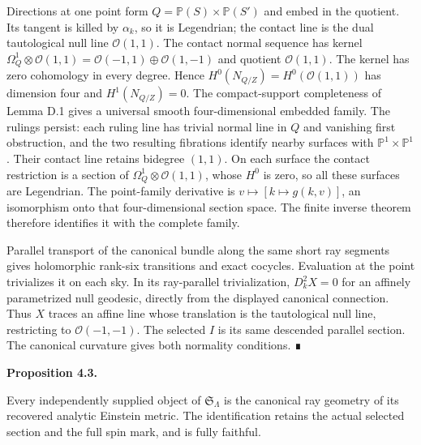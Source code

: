 \documentclass[
  english,
  11pt,
  reqno]{amsart}
\makeatletter
\newcommand{\pandocstatementheading}[1]{%
  \par\addpenalty{\@beginparpenalty}%
  \addvspace{.5\baselineskip plus .2\baselineskip minus .2\baselineskip}%
  {\normalfont\bfseries #1\par}%
  \nobreak\@afterindenttrue\@afterheading
}
\makeatother
\begin{document}
Directions at one point form \(Q=\mathbb P(S)\times\mathbb P(S')\) and
embed in the quotient. Its tangent is killed by \(\alpha_k\), so it is
Legendrian; the contact line is the dual tautological null line
\(\mathcal O(1,1)\). The contact normal sequence has kernel
\(\Omega_Q^1\otimes\mathcal O(1,1)=\mathcal O(-1,1)\oplus\mathcal O(1,-1)\)
and quotient \(\mathcal O(1,1)\). The kernel has zero cohomology in
every degree. Hence \(H^0(N_{Q/Z})=H^0(\mathcal O(1,1))\) has dimension
four and \(H^1(N_{Q/Z})=0\). The compact-support completeness of Lemma
D.1 gives a universal smooth four-dimensional embedded family. The
rulings persist: each ruling line has trivial normal line in \(Q\) and
vanishing first obstruction, and the two resulting fibrations identify
nearby surfaces with \(\mathbb P^1\times\mathbb P^1\). Their contact
line retains bidegree \((1,1)\). On each surface the contact restriction
is a section of \(\Omega_Q^1\otimes\mathcal O(1,1)\), whose \(H^0\) is
zero, so all these surfaces are Legendrian. The point-family derivative
is \(v\mapsto[k\mapsto g(k,v)]\), an isomorphism onto that
four-dimensional section space. The finite inverse theorem therefore
identifies it with the complete family.

Parallel transport of the canonical bundle along the same short ray
segments gives holomorphic rank-six transitions and exact cocycles.
Evaluation at the point trivializes it on each sky. In its ray-parallel
trivialization, \(D_k^2X=0\) for an affinely parametrized null geodesic,
directly from the displayed canonical connection. Thus \(X\) traces an
affine line whose translation is the tautological null line, restricting
to \(\mathcal O(-1,-1)\). The selected \(I\) is its same descended
parallel section. The canonical curvature gives both normality
conditions. ∎

\pandocstatementheading{\protect{}\label{prop:gg-intrinsic-recognition}Proposition 4.3.}

Every independently supplied object of \(\mathfrak S_\Lambda\) is the
canonical ray geometry of its recovered analytic Einstein metric. The
identification retains the actual selected section and the full spin
mark, and is fully faithful.
\end{document}
